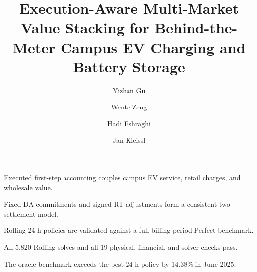 \documentclass[final,5p,times]{elsarticle}
\begin{document}
\begin{frontmatter}

\title{Execution-Aware Multi-Market Value Stacking for Behind-the-Meter Campus EV Charging and Battery Storage}

\author[ucsd]{Yizhan Gu}
\author[totalenergies]{Wente Zeng}
\author[totalenergies]{Hadi Eshraghi}
\author[ucsd]{Jan Kleissl}


\begin{highlights}
\item Executed first-step accounting couples campus EV service, retail charges, and wholesale value.
\item Fixed DA commitments and signed RT adjustments form a consistent two-settlement model.
\item Rolling 24-h policies are validated against a full billing-period Perfect benchmark.
\item All 5,820 Rolling solves and all 19 physical, financial, and solver checks pass.
\item The oracle benchmark exceeds the best 24-h policy by 14.38\% in June 2025.
\end{highlights}


\end{frontmatter}
\end{document}
